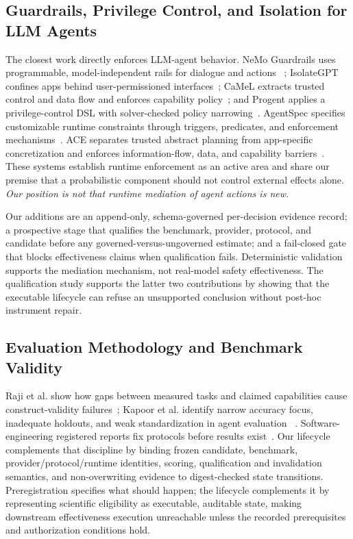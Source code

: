 \documentclass[acmsmall,screen,review,anonymous]{acmart}
\begin{document}
\subsection{Guardrails, Privilege Control, and Isolation for LLM Agents}

The closest work directly enforces LLM-agent behavior. NeMo Guardrails uses
programmable, model-independent rails for dialogue and actions
~\cite{nemoguardrails2023}; IsolateGPT confines apps behind user-permissioned
interfaces~\cite{isolategpt2025}; CaMeL extracts trusted control and data flow and
enforces capability policy~\cite{camel2026}; and Progent applies a privilege-control
DSL with solver-checked policy narrowing~\cite{progent2025}. AgentSpec specifies
customizable runtime constraints through triggers, predicates, and enforcement
mechanisms~\cite{agentspec2026}. ACE separates trusted abstract planning from
app-specific concretization and enforces information-flow, data, and capability
barriers~\cite{ace2026}. These systems establish runtime enforcement as an active
area and share our premise that a probabilistic component should not control
external effects alone. \emph{Our position is not that runtime mediation of agent
actions is new.}

Our additions are an append-only, schema-governed per-decision evidence record; a
prospective stage that qualifies the benchmark, provider, protocol, and candidate
before any governed-versus-ungoverned estimate; and a fail-closed gate that blocks
effectiveness claims when qualification fails. Deterministic validation supports
the mediation mechanism, not real-model safety effectiveness. The qualification
study supports the latter two contributions by showing that the executable
lifecycle can refuse an unsupported conclusion without post-hoc instrument repair.

\subsection{Evaluation Methodology and Benchmark Validity}

Raji et al. show how gaps between measured tasks and claimed capabilities cause
construct-validity failures~\cite{raji2021}; Kapoor et al. identify narrow accuracy
focus, inadequate holdouts, and weak standardization in agent evaluation
~\cite{kapoor2025}. Software-engineering registered reports fix protocols before
results exist~\cite{ernst2023}. Our lifecycle complements that discipline by
binding frozen candidate, benchmark, provider/protocol/runtime identities,
scoring, qualification and invalidation semantics, and non-overwriting evidence
to digest-checked state transitions. Preregistration specifies what should happen;
the lifecycle complements it by representing scientific eligibility as executable,
auditable state, making downstream effectiveness execution unreachable unless the
recorded prerequisites and authorization conditions hold.
\end{document}
